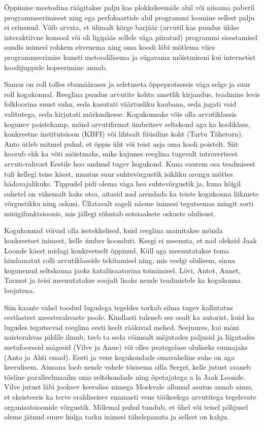 Õppimise meetodina räägitakse palju kas plokkskeemide abil või niisama paberil programmeerimisest ning ega perfokaartide abil programmi loomine sellest palju ei erinenud. Võib arvata, et ülimalt kõrge barjäär (arvutil kas puudus üldse interaktiivne konsool või oli ligipääs sellele väga piiratud) programmi sisestamisel sundis inimesi rohkem süvenema ning oma koodi läbi mõtlema viies programmeerimise kunsti metoodilisema ja sügavama mõistmiseni kui internetist koodijuppide kopeerimine annab.

Samas on roll tolles ebamäärases ja seletuseta õppeprotsessis väga selge ja suur roll kogukonnal. Reeglina puudus arvutite kohta ametlik kirjandus, teadmine levis folkloorina suust suhu, seda kasutati väärtusliku kaubana, seda jagati vaid valitutega, seda kirjutati märkmikesse. Kogukonnaks võis olla arvutiklassis kogunev poistekamp, mõnd arvutifirmat ümbritsev seltskond aga ka kooliklass, konkreetne institutsioon (KBFI) või lihtsalt füüsiline koht (Tartu Tähetorn). Anto ütleb mitmel puhul, et õppis üht või teist asja oma kooli poistelt. Siit koorub ehk ka võti mõistmaks, miks kujunes reeglina tugevalt introvertsest arvuti-rahvast Eestile hoo andnud tugev kogukond. Kuna suurem osa teadmisest tuli kellegi teise käest, muutus suur suhtevõrgustik isikliku arengu mõttes hädavajalikuks. Tippudel pidi olema väga hea suhtevõrgustik ja, kuna kõigil suhetel on vähemalt kaks otsa, aitasid nad arendada ka teiste kogukonna liikmete võrgustikku ning oskusi. Üllatavalt sageli näeme inimesi tegutsemas mingit sorti müügifunktsioonis, mis jällegi rõhutab sotsiaalsete oskuste olulisust. 

Kogukonnad võivad olla isetekkelised, kuid reeglina mainitakse mõnda konkreetset inimest, kelle ümber koonduti. Keegi ei meenuta, et nad oleksid Jaak Loonde käest midagi konkreetselt õppinud. Küll aga meenutatakse tema hindamatut rolli arvutiklasside tekitamisel ning, mis veelgi olulisem, sinna kogunenud seltskonna jaoks katalüsaatorina toimimisel. Lõvi, Antot, Annet, Tarmot ja teisi meenutatakse soojalt lisaks nende teadmistele ka kogukonna loojatena. 

Siin kaante vahel toodud lugudega tegeldes torkab silma tugev kallutatus eestlastest meesterahvaste poole. Kindlasti tuleneb see osalt ka autorist, kuid ka lugudes tegutsevad reeglina eesti keelt rääkivad mehed. Seejuures, kui mõni naisterahvas pildile ilmub, teeb ta seda võimsalt mõjutades paljusid ja liigutades metafoorseid mägesid (Vilve ja Anne) või olles peategelase oluliseks suunajaks (Anto ja Ahti emad). Eesti ja vene kogukondade omavaheline suhe on aga keerulisem. Ainsana loob nende vahele tõsisema silla Sergei, kelle jutust avaneb tõeline paralleelmaailm oma seltskondade ning õpetajatega a la Jaak Loonde. Vilve jutust läbi jooksev keerulise nimega Moskvale allunud asutus annab aimu, et eksisteeris ka terve eraldiseisev enamasti vene töökeelega arvutitega tegelevate organisatsioonide võrgustik. Mõlemal puhul tundub, et ühel või teisel põhjusel oleme jätnud suure hulga tarku inimesi tähelepanuta ja sellest on kahju.

